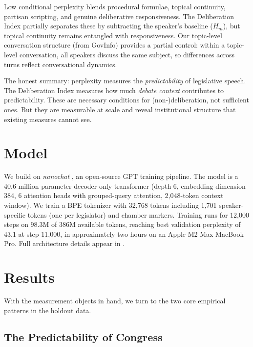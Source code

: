 \documentclass[12pt]{article}
\newcommand{\Hm}{H_m}
\begin{document}
Low conditional perplexity blends procedural formulae, topical continuity, partisan scripting, and genuine deliberative responsiveness. The Deliberation Index partially separates these by subtracting the speaker's baseline ($\Hm$), but topical continuity remains entangled with responsiveness. Our topic-level conversation structure (from GovInfo) provides a partial control: within a topic-level conversation, all speakers discuss the same subject, so differences across turns reflect conversational dynamics.

The honest summary: perplexity measures the \textit{predictability} of legislative speech. The Deliberation Index measures how much \textit{debate context} contributes to predictability. These are necessary conditions for (non-)deliberation, not sufficient ones. But they are measurable at scale and reveal institutional structure that existing measures cannot see.


\section{Model}

We build on \textit{nanochat} \citep{karpathy2025}, an open-source GPT training pipeline. The model is a 40.6-million-parameter decoder-only transformer (depth 6, embedding dimension 384, 6 attention heads with grouped-query attention, 2,048-token context window). We train a BPE tokenizer with 32,768 tokens including 1,701 speaker-specific tokens (one per legislator) and chamber markers. Training runs for 12,000 steps on 98.3M of 386M available tokens, reaching best validation perplexity of 43.1 at step 11,000, in approximately two hours on an Apple M2 Max MacBook Pro. Full architecture details appear in .


\section{Results}

With the measurement objects in hand, we turn to the two core empirical patterns in the holdout data.

\subsection{The Predictability of Congress}
\end{document}

